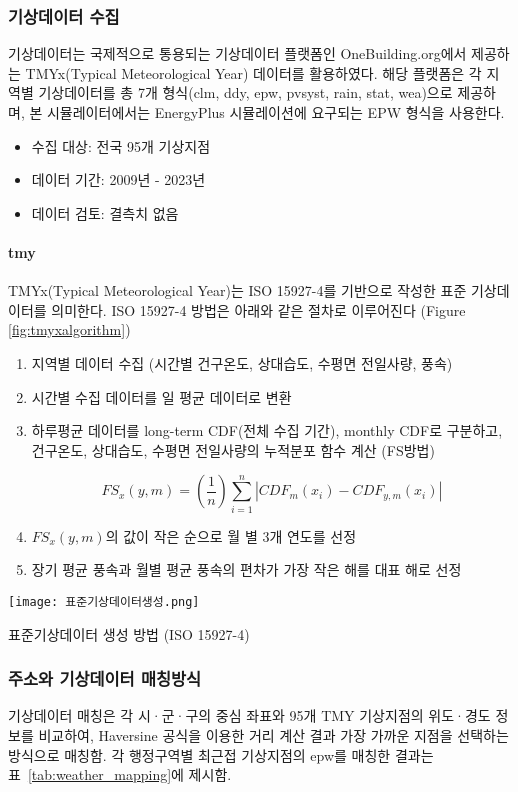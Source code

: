 \subsubsection{기상데이터 수집}
기상데이터는 국제적으로 통용되는 기상데이터 플랫폼인 OneBuilding.org\cite{onebuilding2025}에서 제공하는 TMYx(Typical Meteorological Year) 데이터를 활용하였다. 해당 플랫폼은 각 지역별 기상데이터를 총 7개 형식(clm, ddy, epw, pvsyst, rain, stat, wea)으로 제공하며, 본 시뮬레이터에서는 EnergyPlus 시뮬레이션에 요구되는 EPW 형식을 사용한다.
\begin{itemize}
  \item 수집 대상: 전국 95개 기상지점
  \item 데이터 기간: 2009년 - 2023년
  \item 데이터 검토: 결측치 없음
\end{itemize}
\paragraph{tmy} TMYx(Typical Meteorological Year)는 ISO 15927-4를 기반으로 작성한 표준 기상데이터를 의미한다. ISO 15927-4 방법은 아래와 같은 절차로 이루어진다\cite{shimtmyx} (Figure \ref{fig:tmyxalgorithm})
\begin{enumerate}
  \item 지역별 데이터 수집 (시간별 건구온도, 상대습도, 수평면 전일사량, 풍속)
  \item 시간별 수집 데이터를 일 평균 데이터로 변환
  \item 하루평균 데이터를 long-term CDF(전체 수집 기간), monthly CDF로 구분하고, 건구온도, 상대습도, 수평면 전일사량의 누적분포 함수 계산 (FS방법)
  
\[ 
  FS_{x}(y,m) = \left(\frac{1}{n}\right) \sum_{i=1}^{n} |CDF_{m}(x_{i}) - CDF_{y,m}(x_{i})|
\]

  \item $FS_{x}(y,m)$의 값이 작은 순으로 월 별 3개 연도를 선정
  \item 장기 평균 풍속과 월별 평균 풍속의 편차가 가장 작은 해를 대표 해로 선정
\end{enumerate}

\begin{defaultfigure}
  \texttt{[image: 표준기상데이터생성.png]}
  \caption{표준기상데이터 생성 방법 (ISO 15927-4)}
  \label{fig:tmyxalgorithm}
\end{defaultfigure}


\subsubsection{주소와 기상데이터 매칭방식}
\label{sec:address_weather_matching}
기상데이터 매칭은 각 시·군·구의 중심 좌표와 95개 TMY 기상지점의 위도·경도 정보를 비교하여, Haversine 공식을 이용한 거리 계산 결과 가장 가까운 지점을 선택하는 방식으로 매칭함. 
각 행정구역별 최근접 기상지점의 epw를 매칭한 결과는 표~\ref{tab:weather_mapping}에 제시함.

